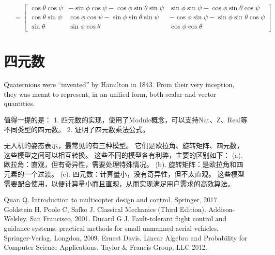 \documentclass{article} %
\numberwithin{equation}{section} %
\begin{document}
\begin{enumerate}
\begin{equation}
\begin{array}{rl}
	~&= \begin{bmatrix}
		\cos\theta\cos\psi &
		-\sin\phi\cos\psi - \cos\phi\sin\theta\sin\psi &
		\sin\phi\sin\psi - \cos\phi\sin\theta\cos\psi \\
		\cos\theta\sin\psi &
		\cos\phi\cos\psi - \sin\phi\sin\theta\sin\psi &
		-\cos\phi\sin\psi - \sin\phi\sin\theta\cos\psi \\
		\sin\theta &
		\sin\phi\cos\theta &
		\cos\phi\cos\theta	
	\end{bmatrix}
\end{array}
\end{equation}
\end{enumerate}


\section{四元数}

Quaternions were ``invented'' by Hamilton in 1843. 
From their very inception, they was meant to represent, in an unified form, both scalar and vector quantities.



值得一提的是：
1. 四元数的实现，使用了Module概念，可以支持Nat、Z、Real等不同类型的四元数。
2. 证明了四元数乘法公式。

无人机的姿态表示，最常见的有三种模型。
它们是欧拉角、旋转矩阵、四元数，这些模型之间可以相互转换。
这些不同的模型各有利弊，主要的区别如下：
(a). 欧拉角：直观，但有奇异性，需要处理特殊情况。
(b). 旋转矩阵：是欧拉角和四元素的一个过渡。
(c). 四元数：计算量小，没有奇异性，但不太直观。
这些模型需要配合使用，以便计算量小而且直观，从而实现满足用户需求的高效算法。




\begin{thebibliography}{99}
 Quan Q. Introduction to multicopter design and control. Springer, 2017.
 Goldstein H, Poole C, Safko J. Classical Mechanics (Third Edition). Addison-Welsley, San Francisco, 2001.
 Ducard G J. Fault-tolerant flight control and guidance systems: practical methods for small unmanned aerial vehicles. Springer-Verlag, Longdon, 2009.
 Ernest Davis. Linear Algebra and Probability for Computer Science Applications. Taylor \& Francis Group, LLC 2012.
\end{thebibliography}
\end{document}
